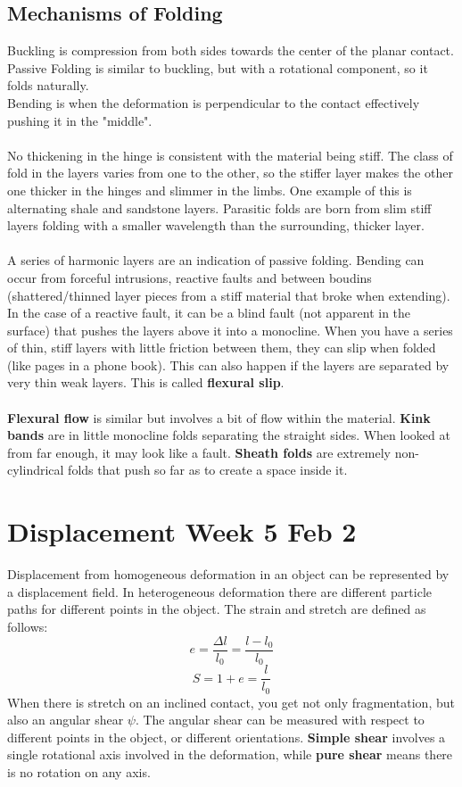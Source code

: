 \documentclass[12pt,a4paper]{report}
\begin{document}
\subsection*{Mechanisms of Folding}
Buckling is compression from both sides towards the center of the planar contact.\\
Passive Folding is similar to buckling, but with a rotational component, so it folds naturally.\\
Bending is when the deformation is perpendicular to the contact effectively pushing it in the "middle".\\
\\
No thickening in the hinge is consistent with the material being stiff.
The class of fold in the layers varies from one to the other, so the stiffer layer makes the other one thicker in the hinges and slimmer in the limbs.
One example of this is alternating shale and sandstone layers.
Parasitic folds are born from slim stiff layers folding with a smaller wavelength than the surrounding, thicker layer.\\
\\
A series of harmonic layers are an indication of passive folding.
Bending can occur from forceful intrusions, reactive faults and between boudins (shattered/thinned layer pieces from a stiff material that broke when extending). In the case of a reactive fault, it can be a blind fault (not apparent in the surface) that pushes the layers above it into a monocline.
When you have a series of thin, stiff layers with little friction between them, they can slip when folded (like pages in a phone book).
This can also happen if the layers are separated by very thin weak layers. This is called \textbf{flexural slip}.\\
\\
\textbf{Flexural flow} is similar but involves a bit of flow within the material.
\textbf{Kink bands} are in little monocline folds separating the straight sides.
When looked at from far enough, it may look like a fault.
\textbf{Sheath folds} are extremely non-cylindrical folds that push so far as to create a space inside it.
\section*{Displacement Week 5 Feb 2}
Displacement from homogeneous deformation in an object can be represented by a displacement field.
In heterogeneous deformation there are different particle paths for different points in the object.
The strain and stretch are defined as follows:
$$ e = \frac{\Delta l}{l_0} = \frac{l - l_0}{l_0} $$
$$ S = 1 + e = \frac{l}{l_0} $$
When there is stretch on an inclined contact, you get not only fragmentation, but also an angular shear $\psi$.
The angular shear can be measured with respect to different points in the object, or different orientations.
\textbf{Simple shear} involves a single rotational axis involved in the deformation, while \textbf{pure shear} means there is no rotation on any axis.
\end{document}
